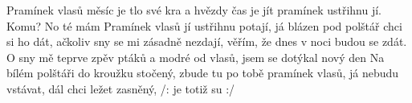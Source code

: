 \begin{TEXT}{Pramínek vlasů}
\SLOKA {} měsíc je tlo své  kra \NL
a hvězdy  čas je jít   \NL
pramínek  ustřihnu jí. \NL
Komu? No  té mám   
\SLOKA Pramínek vlasů jí ustřihnu potají, \NL
já blázen pod polštář chci si ho dát, \NL
ačkoliv sny se mi zásadně nezdají, \NL
věřím, že dnes v noci budou se zdát. 
\SLOKA O sny mě  teprve  \NL
zpěv ptáků  a modré  \NL
od vlasů,  jsem se dotýkal  \NL
nový den    
\SLOKA Na bílém polštáři do kroužku stočený, \NL
zbude tu po tobě pramínek vlasů, \NL
já nebudu vstávat, dál chci ležet zasněný, \NL
/: je totiž  su :/ 
\end{TEXT}
